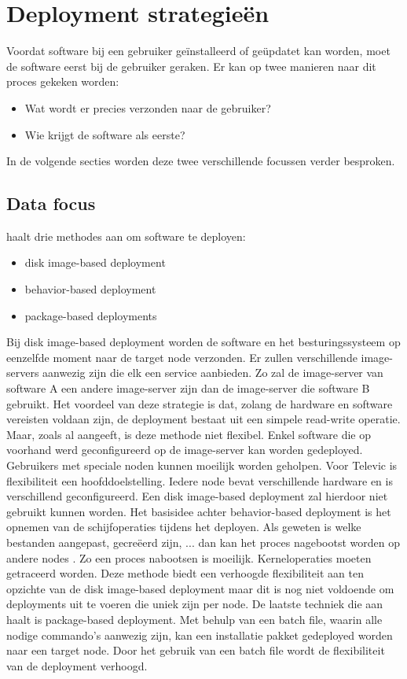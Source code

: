 \section{Deployment strategieën}\label{sec:deployment}
Voordat software bij een gebruiker geïnstalleerd of geüpdatet kan worden, moet de software eerst bij de gebruiker geraken.
Er kan op twee manieren naar dit proces gekeken worden:
\begin{itemize}
\item Wat wordt er precies verzonden naar de gebruiker?
\item Wie krijgt de software als eerste?
\end{itemize}
In de volgende secties worden deze twee verschillende focussen verder besproken.

\subsection{Data focus}
\citet{deploymentMethods} haalt drie methodes aan om software te deployen:
\begin{itemize}
\item disk image-based deployment
\item behavior-based deployment
\item package-based deployments
\end{itemize}
Bij disk image-based deployment worden de software en het besturingssysteem op eenzelfde moment naar de target node verzonden.
Er zullen verschillende image-servers aanwezig zijn die elk een service aanbieden.
Zo zal de image-server van software A een andere image-server zijn dan de image-server die software B gebruikt.
Het voordeel van deze strategie is dat, zolang de hardware en software vereisten voldaan zijn, de deployment bestaat uit een simpele read-write operatie.
Maar, zoals \citet{deploymentMethods} al aangeeft, is deze methode niet flexibel.
Enkel software die op voorhand werd geconfigureerd op de image-server kan worden gedeployed.
Gebruikers met speciale noden kunnen moeilijk worden geholpen.
Voor Televic is flexibiliteit een hoofddoelstelling.
Iedere node bevat verschillende hardware en is verschillend geconfigureerd.
Een disk image-based deployment zal hierdoor niet gebruikt kunnen worden.
Het basisidee achter behavior-based deployment is het opnemen van de schijfoperaties tijdens het deployen.
Als geweten is welke bestanden aangepast, gecreëerd zijn, ... dan kan het proces nagebootst worden op andere nodes \citep{deploymentMethods}.
Zo een proces nabootsen is moeilijk.
Kerneloperaties moeten getraceerd worden.
Deze methode biedt een verhoogde flexibiliteit aan ten opzichte van de disk image-based deployment maar dit is nog niet voldoende om deployments uit te voeren die uniek zijn per node.
De laatste techniek die \citet{deploymentMethods} aan haalt is package-based deployment.
Met behulp van een batch file, waarin alle nodige commando's aanwezig zijn, kan een installatie pakket gedeployed worden naar een target node.
Door het gebruik van een batch file wordt de flexibiliteit van de deployment verhoogd.

